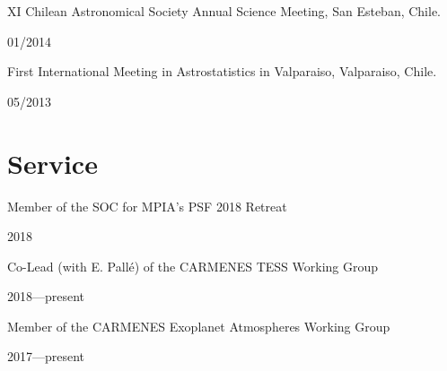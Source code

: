 \documentclass[12pt, a4paper]{article} %
\begin{document}
\begin{minipage}[t]{0.7\textwidth}
\begin{flushleft}%
  \setlength{\leftskip}{0.2cm}%
XI Chilean Astronomical Society Annual Science Meeting, San Esteban, Chile.
\end{flushleft}
\end{minipage}
\begin{minipage}[t]{0.3\textwidth}
\hfill 01/2014
\end{minipage}

\begin{minipage}[t]{0.7\textwidth}
\begin{flushleft}%
  \setlength{\leftskip}{0.2cm}%
First International Meeting in Astrostatistics in Valparaiso, Valparaiso, Chile. 
\end{flushleft}
\end{minipage}
\begin{minipage}[t]{0.3\textwidth}
\hfill 05/2013
\end{minipage}

\section*{Service}

\begin{minipage}[t]{0.7\textwidth}
\begin{flushleft}%
  \setlength{\leftskip}{0.2cm}%
Member of the SOC for MPIA's PSF 2018 Retreat 
\end{flushleft}
\end{minipage}
\begin{minipage}[t]{0.3\textwidth}
\hfill 2018
\end{minipage}

\begin{minipage}[t]{0.7\textwidth}
\begin{flushleft}%
  \setlength{\leftskip}{0.2cm}%
Co-Lead (with E. Pall\'e) of the CARMENES TESS Working Group 
\end{flushleft}
\end{minipage}
\begin{minipage}[t]{0.3\textwidth}
\hfill 2018---present
\end{minipage}

\begin{minipage}[t]{0.7\textwidth}
\begin{flushleft}%
  \setlength{\leftskip}{0.2cm}%
Member of the CARMENES Exoplanet Atmospheres Working Group 
\end{flushleft}
\end{minipage}
\begin{minipage}[t]{0.3\textwidth}
\hfill 2017---present
\end{minipage}
\end{document}
